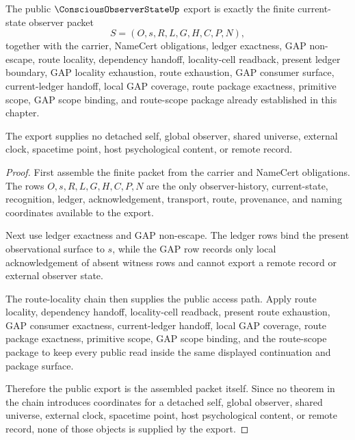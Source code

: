\begin{theorem}
\label{thm:conscious-observer-state-public-export}
The public $\ConsciousObserverStateUp$ export is exactly the finite current-state observer packet
$$
S=(O,s,R,L,G,H,C,P,N),
$$
together with the carrier, NameCert obligations, ledger exactness, GAP non-escape, route locality, dependency handoff, locality-cell readback, present ledger boundary, GAP locality exhaustion, route exhaustion, GAP consumer surface, current-ledger handoff, local GAP coverage, route package exactness, primitive scope, GAP scope binding, and route-scope package already established in this chapter.

The export supplies no detached self, global observer, shared universe, external clock, spacetime point, host psychological content, or remote record.
\end{theorem}
\begin{proof}
First assemble the finite packet from the carrier and NameCert obligations. The rows $O,s,R,L,G,H,C,P,N$ are the only observer-history, current-state, recognition, ledger, acknowledgement, transport, route, provenance, and naming coordinates available to the export.

Next use ledger exactness and GAP non-escape. The ledger rows bind the present observational surface to $s$, while the GAP row records only local acknowledgement of absent witness rows and cannot export a remote record or external observer state.

The route-locality chain then supplies the public access path. Apply route locality, dependency handoff, locality-cell readback, present route exhaustion, GAP consumer exactness, current-ledger handoff, local GAP coverage, route package exactness, primitive scope, GAP scope binding, and the route-scope package to keep every public read inside the same displayed continuation and package surface.

Therefore the public export is the assembled packet itself. Since no theorem in the chain introduces coordinates for a detached self, global observer, shared universe, external clock, spacetime point, host psychological content, or remote record, none of those objects is supplied by the export.
\end{proof}

